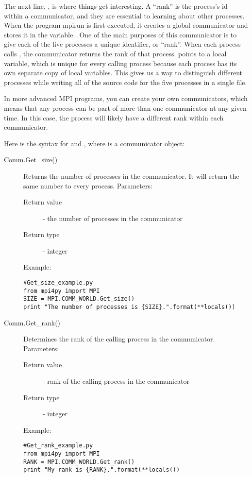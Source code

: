 The next line, , is where things get interesting. A ``rank'' is the process's id within a communicator, and they are essential to learning about other processes. When the program mpirun is first executed, it creates a global communicator and stores it in the variable . One of the main purposes of this communicator is to give each of the five processes a unique identifier, or ``rank''. When each process calls , the communicator returns the rank of that process.  points to a local variable, which is unique for every calling process because each process has its own separate copy of local variables. This gives us a way to distinguish different processes while writing all of the source code for the five processes in a single file.

In more advanced MPI programs, you can create your own communicators, which means that any process can be part of more than one communicator at any given time. In this case, the process will likely have a different rank within each communicator.


Here is the syntax for  and , where  is a communicator object:

\begin{description}
\item[Comm.Get\_size()]
Returns the number of processes in the communicator. It will return the same number to every process.
Parameters:
\begin{description}
    \item[Return value] - the number of processes in the communicator
    \item[Return type] - integer
\end{description}
Example:
\begin{lstlisting}
#Get_size_example.py
from mpi4py import MPI
SIZE = MPI.COMM_WORLD.Get_size()
print "The number of processes is {SIZE}.".format(**locals())
\end{lstlisting}
\item[Comm.Get\_rank()]
Determines the rank of the calling process in the communicator.
Parameters:
\begin{description}
    \item[Return value] - rank of the calling process in the communicator
    \item[Return type] - integer
\end{description}
Example:
\begin{lstlisting}
#Get_rank_example.py
from mpi4py import MPI
RANK = MPI.COMM_WORLD.Get_rank()
print "My rank is {RANK}.".format(**locals())
\end{lstlisting}
\end{description}



